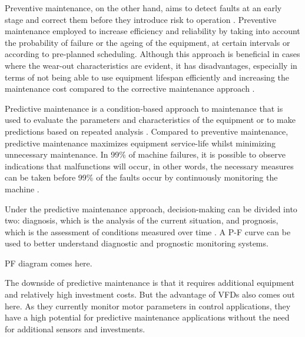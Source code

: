 Preventive maintenance, on the other hand, aims to detect faults at an early stage and correct them before they introduce risk to operation \cite{en201713306}. Preventive maintenance employed to increase efficiency and reliability by taking into account the probability of failure or the ageing of the equipment, at certain intervals or according to pre-planned scheduling. Although this approach is beneficial in cases where the wear-out characteristics are evident, it has disadvantages, especially in terms of not being able to use equipment lifespan efficiently and increasing the maintenance cost compared to the corrective maintenance approach \cite{AHMAD}.

Predictive maintenance is a condition-based approach to maintenance that is used to evaluate the parameters and characteristics of the equipment or to make predictions based on repeated analysis \cite{en201713306}. Compared to preventive maintenance, predictive maintenance maximizes equipment service-life whilst minimizing unnecessary maintenance. In 99\% of machine failures, it is possible to observe indications that malfunctions will occur, in other words, the necessary measures can be taken before 99\% of the faults occur by continuously monitoring the machine \cite{AHMAD}.

Under the predictive maintenance approach, decision-making can be divided into two: diagnosis, which is the analysis of the current situation, and prognosis, which is the assessment of conditions measured over time \cite{tinga2019physical}. A P-F curve can be used to better understand diagnostic and prognostic monitoring systems.

PF diagram comes here.

The downside of predictive maintenance is that it requires additional equipment and relatively high investment costs. But the advantage of VFDs also comes out here. As they currently monitor motor parameters in control applications, they have a high potential for predictive maintenance applications without the need for additional sensors and investments.


